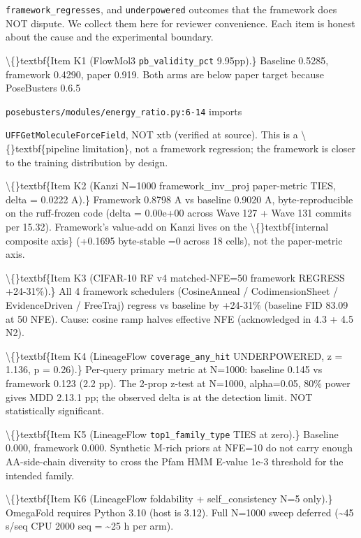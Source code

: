 \documentclass[preprint,3p,times,twocolumn]{elsarticle}
\begin{document}
\texttt{framework\_regresses}, and \texttt{underpowered} outcomes that the framework does NOT dispute. We collect them here for reviewer convenience. Each item is honest about the cause and the experimental boundary.

\textbackslash\{\}textbf\{Item K1 (FlowMol3 \texttt{pb\_validity\_pct} 9.95pp).\} Baseline 0.5285, framework 0.4290, paper 0.919. Both arms are below paper target because PoseBusters 0.6.5

\texttt{posebusters/modules/energy\_ratio.py:6-14} imports

\texttt{UFFGetMoleculeForceField}, NOT xtb (verified at source). This is a \textbackslash\{\}textbf\{pipeline limitation\}, not a framework regression; the framework is closer to the training distribution by design.

\textbackslash\{\}textbf\{Item K2 (Kanzi N=1000 framework\_inv\_proj paper-metric TIES, delta = 0.0222 A).\} Framework 0.8798 A vs baseline 0.9020 A, byte-reproducible on the ruff-frozen code (delta = 0.00e+00 across Wave 127 + Wave 131 commits per 15.32). Framework's value-add on Kanzi lives on the \textbackslash\{\}textbf\{internal composite axis\} (+0.1695 byte-stable =0 across 18 cells), not the paper-metric axis.

\textbackslash\{\}textbf\{Item K3 (CIFAR-10 RF v4 matched-NFE=50 framework REGRESS +24-31\%).\} All 4 framework schedulers (CosineAnneal / CodimensionSheet / EvidenceDriven / FreeTraj) regress vs baseline by +24-31\% (baseline FID 83.09 at 50 NFE). Cause: cosine ramp halves effective NFE (acknowledged in 4.3 + 4.5 N2).

\textbackslash\{\}textbf\{Item K4 (LineageFlow \texttt{coverage\_any\_hit} UNDERPOWERED, z = 1.136, p = 0.26).\} Per-query primary metric at N=1000: baseline 0.145 vs framework 0.123 (2.2 pp). The 2-prop z-test at N=1000, alpha=0.05, 80\% power gives MDD  2.13.1 pp; the observed delta is at the detection limit. NOT statistically significant.

\textbackslash\{\}textbf\{Item K5 (LineageFlow \texttt{top1\_family\_type} TIES at zero).\} Baseline 0.000, framework 0.000. Synthetic M-rich priors at NFE=10 do not carry enough AA-side-chain diversity to cross the Pfam HMM E-value 1e-3 threshold for the intended family.

\textbackslash\{\}textbf\{Item K6 (LineageFlow foldability + self\_consistency N=5 only).\} OmegaFold requires Python  3.10 (host is 3.12). Full N=1000 sweep deferred (\textasciitilde{}45 s/seq CPU  2000 seq = \textasciitilde{}25 h per arm).
\end{document}
